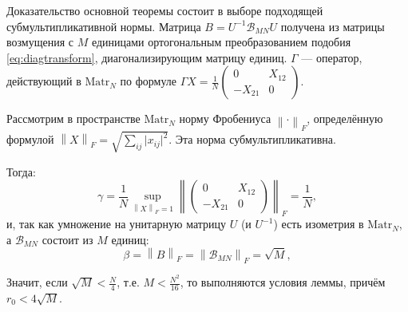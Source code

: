 Доказательство основной теоремы
состоит в выборе подходящей субмультипликативной нормы.
Матрица \( B = U^{-1} \mathscr{B}_{MN} U \)
получена из матрицы возмущения с \( M \) единицами
ортогональным преобразованием подобия \eqref{eq:diagtransform},
диагонализирующим матрицу единиц.
\( \Gamma \) --- оператор, действующий в \( \mathrm{Matr}_{N} \)
по формуле
\( { \Gamma X = \frac1N \begin{pmatrix}0 & X_{12} \\ -X_{21} & 0\end{pmatrix} } \).

Рассмотрим в пространстве \( \mathrm{Matr}_{N} \)
норму Фробениуса \( {\left\|\cdot\right\|}_{F} \),
определённую формулой
\( {\left\|X\right\|}_{F} = \sqrt{\sum_{ij} \lvert x_{ij}\rvert^2}. \)
Эта норма субмультипликативна.

Тогда:
\[ \gamma = \frac1N
            \sup_{{\left\|X\right\|}_{F}=1}{\left\|\begin{pmatrix}0 & X_{12} \\ -X_{21} & 0\end{pmatrix}\right\|}_{F}
          = \frac1N,
    \]
и, так как умножение на унитарную матрицу \( U \)
    (и \( U^{-1} \)) есть изометрия в \( \mathrm{Matr}_{N} \),
    а \( \mathscr{B}_{MN} \) состоит из \( M \) единиц:
\[
    \beta = {\left\|B\right\|}_{F} =
    {\left\|\mathscr{B}_{MN}\right\|}_{F} = \sqrt{M},
    \]

Значит, если
\( \sqrt{M} < \frac{N}{4} \), т.е.
\( M < \frac{N^2}{16} \),
то выполняются условия леммы,
причём \( r_0 < 4\sqrt{M} \).
